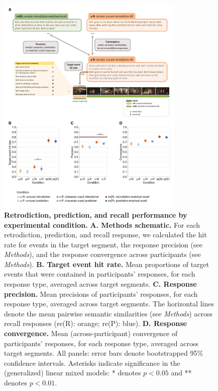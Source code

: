 \documentclass[10pt]{article}
\begin{document}
\begin{figure}[tp]
  \centering
  \includegraphics[width=0.80\textwidth]{results1}
  \caption{\textbf{Retrodiction, prediction, and recall performance by experimental condition.} \textbf{A.  Methods schematic.}  For each retrodiction, prediction, and recall response, we calculated the hit rate for events in the target segment, the response precision (see \textit{Methods}), and the response convergence across participants (see \textit{Methods}).  \textbf{B. Target event hit rate.} Mean proportions of target events that were contained in participants' responses, for each response type, averaged across target segments.  \textbf{C. Response precision.}  Mean precisions of participants' responses, for each response type, averaged across target segments.  The horizontal lines denote the mean pairwise semantic similarities (see \textit{Methods}) across recall responses (re(R): orange; re(P): blue).  \textbf{D. Response convergence.}  Mean (across-participant) convergence of participants' responses, for each response type, averaged across target segments.  All panels: error bars denote bootstrapped 95\% confidence intervals.  Asterisks indicate significance in the (generalized) linear mixed models: * denotes $p < 0.05$ and ** denotes $p < 0.01$.}
  \label{fig:result1}
\end{figure}
\end{document}
